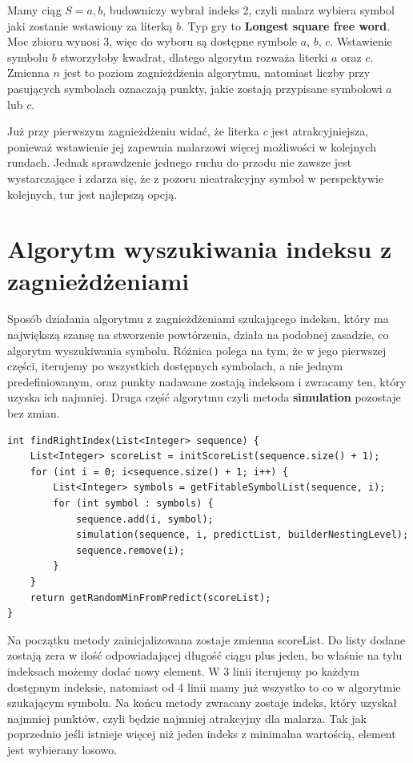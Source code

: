 \documentclass[document]{xmgr}
\begin{document}
Mamy ciąg $S = a, b$, budowniczy wybrał indeks 2, czyli malarz wybiera symbol jaki zostanie wstawiony za literką $b$. Typ gry to \textbf{Longest square free word}. Moc zbioru wynosi 3, więc do wyboru są dostępne symbole $a$, $b$, $c$. Wstawienie symbolu $b$ stworzyłoby kwadrat, dlatego algorytm rozważa literki $a$ oraz $c$. Zmienna $n$ jest to poziom zagnieżdżenia algorytmu, natomiast liczby przy pasujących symbolach oznaczają punkty, jakie zostają przypisane symbolowi $a$ lub $c$. 

Już przy pierwszym zagnieżdżeniu widać, że literka $c$ jest atrakcyjniejsza, ponieważ wstawienie jej zapewnia malarzowi więcej możliwości w kolejnych rundach. Jednak sprawdzenie jednego ruchu do przodu nie zawsze jest wystarczające i zdarza się, że z pozoru nieatrakcyjny symbol w perspektywie kolejnych, tur jest najlepszą opcją.

\section{Algorytm wyszukiwania indeksu z zagnieżdżeniami}
Sposób działania algorytmu z zagnieżdżeniami szukającego indeksu, który ma największą szansę na stworzenie powtórzenia, działa na podobnej zasadzie, co algorytm wyszukiwania symbolu. Różnica polega na tym, że w jego pierwszej części, iterujemy po wszystkich dostępnych symbolach, a nie jednym predefiniowanym, oraz punkty nadawane zostają indeksom i zwracamy ten, który uzyska ich najmniej. Druga część algorytmu czyli metoda \textbf{simulation} pozostaje bez zmian.

\begin{lstlisting}[frame=single]
int findRightIndex(List<Integer> sequence) {
	List<Integer> scoreList = initScoreList(sequence.size() + 1);
	for (int i = 0; i<sequence.size() + 1; i++) {
		List<Integer> symbols = getFitableSymbolList(sequence, i);
		for (int symbol : symbols) {
			sequence.add(i, symbol);
			simulation(sequence, i, predictList, builderNestingLevel);
			sequence.remove(i);
		}
	}
	return getRandomMinFromPredict(scoreList);
}
\end{lstlisting}

Na początku metody zainicjalizowana zostaje zmienna scoreList. Do listy dodane zostają zera w ilość odpowiadającej długość ciągu plus jeden, bo właśnie na tylu indeksach możemy dodać nowy element. W 3 linii iterujemy po każdym dostępnym indeksie, natomiast od 4 linii mamy już wszystko to co w algorytmie szukającym symbolu. Na końcu metody zwracany zostaje indeks, który uzyskał najmniej punktów, czyli będzie najmniej atrakcyjny dla malarza. Tak jak poprzednio jeśli istnieje więcej niż jeden indeks z minimalna wartością, element jest wybierany losowo.
\end{document}
